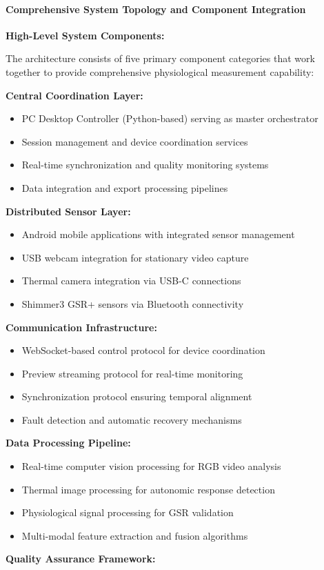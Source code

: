 \documentclass[12pt,a4paper]{report}
\begin{document}
\paragraph{Comprehensive System Topology and Component Integration}

\textbf{High-Level System Components:}

The architecture consists of five primary component categories that work together to provide comprehensive physiological
measurement capability:

\textbf{Central Coordination Layer:}

\begin{itemize}
\item PC Desktop Controller (Python-based) serving as master orchestrator
\item Session management and device coordination services
\item Real-time synchronization and quality monitoring systems
\item Data integration and export processing pipelines

\end{itemize}
\textbf{Distributed Sensor Layer:}

\begin{itemize}
\item Android mobile applications with integrated sensor management
\item USB webcam integration for stationary video capture
\item Thermal camera integration via USB-C connections
\item Shimmer3 GSR+ sensors via Bluetooth connectivity

\end{itemize}
\textbf{Communication Infrastructure:}

\begin{itemize}
\item WebSocket-based control protocol for device coordination
\item Preview streaming protocol for real-time monitoring
\item Synchronization protocol ensuring temporal alignment
\item Fault detection and automatic recovery mechanisms

\end{itemize}
\textbf{Data Processing Pipeline:}

\begin{itemize}
\item Real-time computer vision processing for RGB video analysis
\item Thermal image processing for autonomic response detection
\item Physiological signal processing for GSR validation
\item Multi-modal feature extraction and fusion algorithms

\end{itemize}
\textbf{Quality Assurance Framework:}
\end{document}

